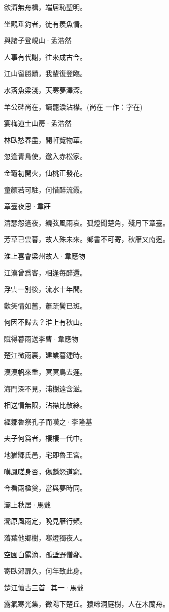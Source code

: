 \documentclass[12pt,a4paper]{ctexbook}
\begin{document}
欲濟無舟楫，端居恥聖明。\par
坐觀垂釣者，徒有羨魚情。\par
與諸子登峴山·孟浩然\par
人事有代謝，往來成古今。\par
江山留勝蹟，我輩復登臨。\par
水落魚梁淺，天寒夢澤深。\par
羊公碑尚在，讀罷淚沾襟。(尚在 一作：字在)\par
宴梅道士山房·孟浩然\par
林臥愁春盡，開軒覽物華。\par
忽逢青鳥使，邀入赤松家。\par
金竈初開火，仙桃正發花。\par
童顏若可駐，何惜醉流霞。\par
章臺夜思·韋莊\par
清瑟怨遙夜，繞弦風雨哀。孤燈聞楚角，殘月下章臺。\par
芳草已雲暮，故人殊未來。鄉書不可寄，秋雁又南迴。\par
淮上喜會梁州故人·韋應物\par
江漢曾爲客，相逢每醉還。\par
浮雲一別後，流水十年間。\par
歡笑情如舊，蕭疏鬢已斑。\par
何因不歸去？淮上有秋山。\par
賦得暮雨送李曹·韋應物\par
楚江微雨裏，建業暮鍾時。\par
漠漠帆來重，冥冥鳥去遲。\par
海門深不見，浦樹遠含滋。\par
相送情無限，沾襟比散絲。\par
經鄒魯祭孔子而嘆之·李隆基\par
夫子何爲者，棲棲一代中。\par
地猶鄹氏邑，宅即魯王宮。\par
嘆鳳嗟身否，傷麟怨道窮。\par
今看兩楹奠，當與夢時同。\par
灞上秋居·馬戴\par
灞原風雨定，晚見雁行頻。\par
落葉他鄉樹，寒燈獨夜人。\par
空園白露滴，孤壁野僧鄰。\par
寄臥郊扉久，何年致此身。\par
楚江懷古三首·其一·馬戴\par
露氣寒光集，微陽下楚丘。猿啼洞庭樹，人在木蘭舟。\par
\end{document}
